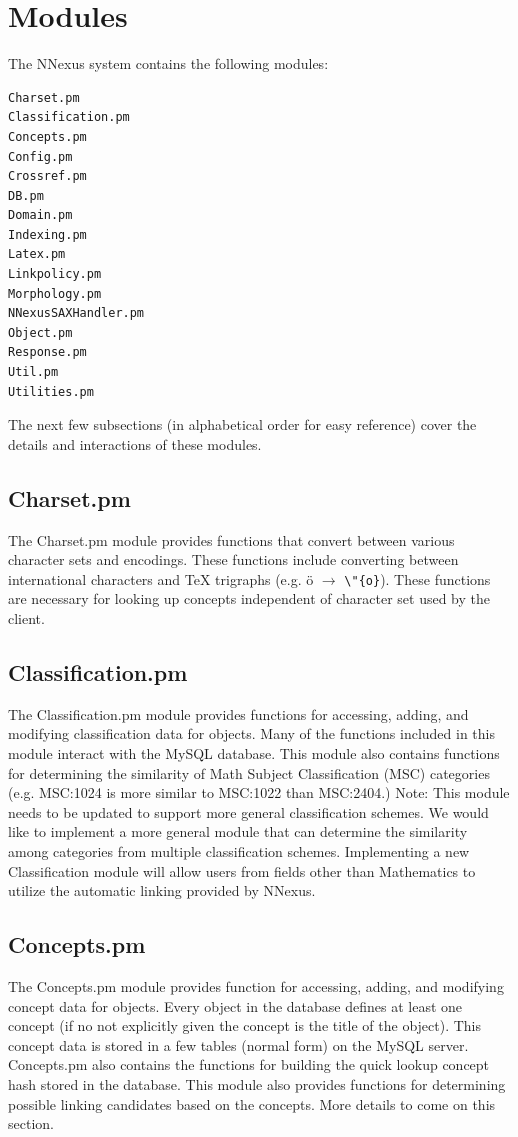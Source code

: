 \documentclass{article}
\begin{document}
\section{Modules}
The NNexus system contains the following modules:
\begin{verbatim}
Charset.pm
Classification.pm
Concepts.pm
Config.pm
Crossref.pm
DB.pm
Domain.pm
Indexing.pm
Latex.pm
Linkpolicy.pm
Morphology.pm
NNexusSAXHandler.pm
Object.pm
Response.pm
Util.pm
Utilities.pm
\end{verbatim}

The next few subsections (in alphabetical order for easy reference) cover the details and interactions of these modules.

\subsection{Charset.pm}
The Charset.pm module provides functions that convert between various character
sets and encodings. These functions include converting between international characters and TeX trigraphs (e.g. \"{o} $\rightarrow$ \verb#\"{o}#). These functions are necessary for looking up concepts independent of character set used by the client.

\subsection{Classification.pm}
The Classification.pm module provides functions for accessing, adding, and modifying classification data for objects. Many of the functions included
in this module interact with the MySQL database. This module also contains
functions for determining the similarity of Math Subject Classification (MSC)
categories (e.g. MSC:1024 is more similar to MSC:1022 than MSC:2404.) Note:
This module needs to be updated to support more general classification schemes.
We would like to implement a more general
module that can determine the similarity among categories from multiple
classification schemes. Implementing a new Classification module will allow users from fields other than Mathematics to utilize the automatic linking provided by NNexus.

\subsection{Concepts.pm}
The Concepts.pm module provides function for accessing, adding, and modifying
concept data for objects. Every object in the database defines at least
one concept (if no not explicitly given the concept is the title of the object).
This concept data is stored in a few tables (normal form) on the MySQL server.
Concepts.pm also contains the functions for building the quick lookup concept
hash stored in the database. This module also provides functions for
determining possible linking candidates based on the concepts. More details to come on this section.
\end{document}
